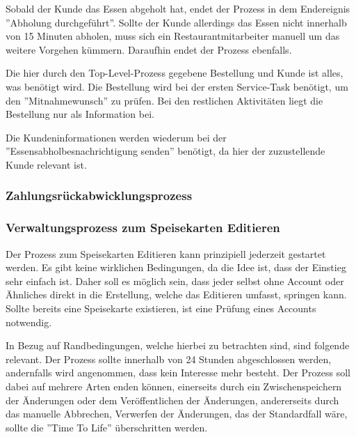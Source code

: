 Sobald der Kunde das Essen abgeholt hat, endet der Prozess in dem Endereignis ''Abholung durchgeführt''. Sollte der Kunde allerdings das Essen nicht innerhalb von 15 Minuten abholen, muss sich ein Restaurantmitarbeiter manuell um das weitere Vorgehen kümmern. Daraufhin endet der Prozess ebenfalls.

Die hier durch den Top-Level-Prozess gegebene Bestellung und Kunde ist alles, was benötigt wird. Die Bestellung wird bei der ersten Service-Task benötigt, um den ''Mitnahmewunsch'' zu prüfen. Bei den restlichen Aktivitäten liegt die Bestellung nur als Information bei. 

Die Kundeninformationen werden wiederum bei der ''Essensabholbesnachrichtigung senden'' benötigt, da hier der zuzustellende Kunde relevant ist.

\subsubsection{Zahlungsrückabwicklungsprozess}
\clearpage
{}


\subsubsection{Verwaltungsprozess zum Speisekarten Editieren}
Der Prozess zum Speisekarten Editieren kann prinzipiell jederzeit gestartet werden. Es gibt keine wirklichen Bedingungen, da die Idee ist, dass der Einstieg sehr einfach ist. Daher soll es möglich sein, dass jeder selbst ohne Account oder Ähnliches direkt in die Erstellung, welche das Editieren umfasst, springen kann. Sollte bereits eine Speisekarte existieren, ist eine Prüfung eines Accounts notwendig.

In Bezug auf Randbedingungen, welche hierbei zu betrachten sind, sind folgende relevant. Der Prozess sollte innerhalb von 24 Stunden abgeschlossen werden, andernfalls wird angenommen, dass kein Interesse mehr besteht. Der Prozess soll dabei auf mehrere Arten enden können, einerseits durch ein Zwischenspeichern der Änderungen oder dem Veröffentlichen der Änderungen, andererseits durch das manuelle Abbrechen, Verwerfen der Änderungen, das der Standardfall wäre, sollte die ''Time To Life'' überschritten werden.


